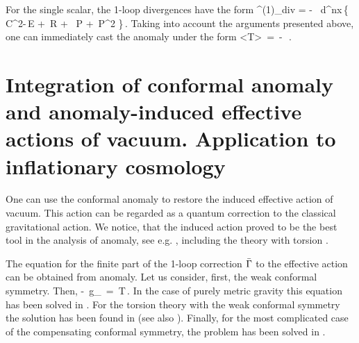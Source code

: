  For the single scalar, the 1-loop divergences have the form
 \bea
 \Ga^{(1)}_{div} = - \,
 \int d^nx\,\left\{\,C^2-\,E
 + \,{\Box}R + \,{\Box} {\cal P}
 + \,{\cal P}^2 \right \}\,.
 \label{div}
 \eea
 Taking into account the arguments presented
 above, one can immediately cast the anomaly under the form
 \bea
 <{\cal T}> \,=\, - \,\,.
 \label{tracean}
 \eea

\section{Integration of conformal anomaly
and anomaly-induced effective actions of vacuum.
Application to inflationary cosmology}

One can use the conformal anomaly to restore the induced 
effective action of vacuum. This action can be regarded as 
a quantum correction to the classical gravitational action.
We notice, that the induced action proved to be the best 
tool in the analysis of anomaly, see e.g. \cite{balbi,anju},
including the theory with torsion \cite{buodsh}.

The equation for the finite part of the 1-loop correction 
${\bar {\Gamma}}$
to the effective action can be obtained from anomaly.
Let us consider, first, the weak conformal symmetry. Then,
\beq
- \,g_{\mu\nu}
 \,=\, T\,.
\label{maineq}
\eeq
In the case of purely metric gravity this equation has 
been solved in \cite{rei,frts}. For the 
torsion theory with the weak conformal symmetry the 
solution has been found in \cite{buodsh} (see also 
\cite{book}). Finally, for the most complicated case of the 
compensating conformal symmetry, the problem has been 
solved in \cite{anhesh}.

